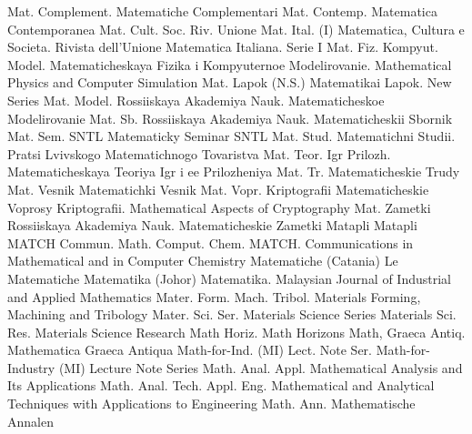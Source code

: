{Mat. Complement.}
{Matematiche Complementari}
{Mat. Contemp.}
{Matematica Contemporanea}
{Mat. Cult. Soc. Riv. Unione Mat. Ital. (I)}
{Matematica, Cultura e Societa. Rivista dell'Unione Matematica Italiana. Serie I}
{Mat. Fiz. Kompyut. Model.}
{Matematicheskaya Fizika i Kompyuternoe Modelirovanie. Mathematical Physics and Computer Simulation}
{Mat. Lapok (N.S.)}
{Matematikai Lapok. New Series}
{Mat. Model.}
{Rossiiskaya Akademiya Nauk. Matematicheskoe Modelirovanie}
{Mat. Sb.}
{Rossiiskaya Akademiya Nauk. Matematicheskii Sbornik}
{Mat. Sem. SNTL}
{Matematicky Seminar SNTL}
{Mat. Stud.}
{Matematichni Studii. Pratsi Lvivskogo Matematichnogo Tovaristva}
{Mat. Teor. Igr Prilozh.}
{Matematicheskaya Teoriya Igr i ee Prilozheniya}
{Mat. Tr.}
{Matematicheskie Trudy}
{Mat. Vesnik}
{Matematichki Vesnik}
{Mat. Vopr. Kriptografii}
{Matematicheskie Voprosy Kriptografii. Mathematical Aspects of Cryptography}
{Mat. Zametki}
{Rossiiskaya Akademiya Nauk. Matematicheskie Zametki}
{Matapli}
{Matapli}
{MATCH Commun. Math. Comput. Chem.}
{MATCH. Communications in Mathematical and in Computer Chemistry}
{Matematiche (Catania)}
{Le Matematiche}
{Matematika (Johor)}
{Matematika. Malaysian Journal of Industrial and Applied Mathematics}
{Mater. Form. Mach. Tribol.}
{Materials Forming, Machining and Tribology}
{Mater. Sci. Ser.}
{Materials Science Series}
{Materials Sci. Res.}
{Materials Science Research}
{Math Horiz.}
{Math Horizons}
{Math, Graeca Antiq.}
{Mathematica Graeca Antiqua}
{Math-for-Ind. (MI) Lect. Note Ser.}
{Math-for-Industry (MI) Lecture Note Series}
{Math. Anal. Appl.}
{Mathematical Analysis and Its Applications}
{Math. Anal. Tech. Appl. Eng.}
{Mathematical and Analytical Techniques with Applications to Engineering}
{Math. Ann.}
{Mathematische Annalen}
